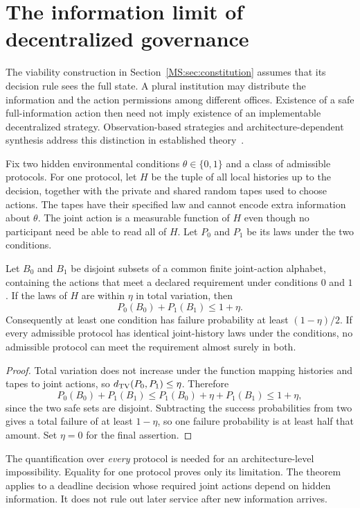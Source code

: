 \section{The information limit of decentralized governance}\label{MS:sec:decentral}
The viability construction in Section~\ref{MS:sec:constitution} assumes that its decision rule sees the full state. A plural institution may distribute the information and the action permissions among different offices. Existence of a safe full-information action then need not imply existence of an implementable decentralized strategy. Observation-based strategies and architecture-dependent synthesis address this distinction in established theory~\cite{MS:chatterjee,MS:pnuelirosner}.

Fix two hidden environmental conditions $\theta\in\{0,1\}$ and a class of admissible protocols. For one protocol, let $H$ be the tuple of all local histories up to the decision, together with the private and shared random tapes used to choose actions. The tapes have their specified law and cannot encode extra information about $\theta$. The joint action is a measurable function of $H$ even though no participant need be able to read all of $H$. Let $P_0$ and $P_1$ be its laws under the two conditions.

\begin{MStheorem}\label{MS:thm:decsafe}
Let $B_0$ and $B_1$ be disjoint subsets of a common finite joint-action alphabet, containing the actions that meet a declared requirement under conditions $0$ and $1$. If the laws of $H$ are within $\eta$ in total variation, then
\[
P_0(B_0)+P_1(B_1)\leq1+\eta.
\]
Consequently at least one condition has failure probability at least $(1-\eta)/2$. If every admissible protocol has identical joint-history laws under the conditions, no admissible protocol can meet the requirement almost surely in both.
\end{MStheorem}
\begin{proof}
Total variation does not increase under the function mapping histories and tapes to joint actions, so $d_{\mathrm{TV}}(P_0,P_1)\leq\eta$. Therefore
\[
P_0(B_0)+P_1(B_1)
\leq P_1(B_0)+\eta+P_1(B_1)\leq1+\eta,
\]
since the two safe sets are disjoint. Subtracting the success probabilities from two gives a total failure of at least $1-\eta$, so one failure probability is at least half that amount. Set $\eta=0$ for the final assertion.
\end{proof}

The quantification over \emph{every} protocol is needed for an architecture-level impossibility. Equality for one protocol proves only its limitation. The theorem applies to a deadline decision whose required joint actions depend on hidden information. It does not rule out later service after new information arrives.


